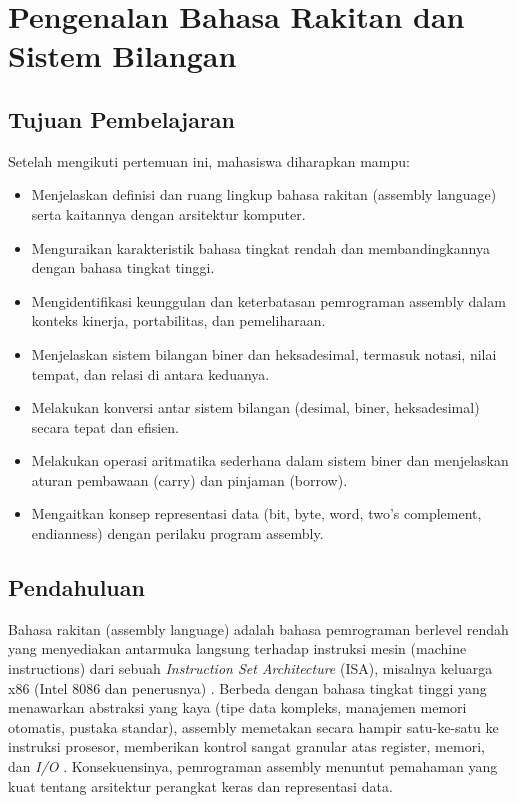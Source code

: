 \chapter{Pengenalan Bahasa Rakitan dan Sistem Bilangan}\label{ch:pengenalan}

\section{Tujuan Pembelajaran}\label{sec:pengenalan-tujuan}
Setelah mengikuti pertemuan ini, mahasiswa diharapkan mampu:
\begin{itemize}
    \item Menjelaskan definisi dan ruang lingkup bahasa rakitan (assembly language) serta kaitannya dengan arsitektur komputer.
    \item Menguraikan karakteristik bahasa tingkat rendah dan membandingkannya dengan bahasa tingkat tinggi.
    \item Mengidentifikasi keunggulan dan keterbatasan pemrograman assembly dalam konteks kinerja, portabilitas, dan pemeliharaan.
    \item Menjelaskan sistem bilangan biner dan heksadesimal, termasuk notasi, nilai tempat, dan relasi di antara keduanya.
    \item Melakukan konversi antar sistem bilangan (desimal, biner, heksadesimal) secara tepat dan efisien.
    \item Melakukan operasi aritmatika sederhana dalam sistem biner dan menjelaskan aturan pembawaan (carry) dan pinjaman (borrow).
    \item Mengaitkan konsep representasi data (bit, byte, word, two's complement, endianness) dengan perilaku program assembly.
\end{itemize}

\section{Pendahuluan}\label{sec:pengenalan-pendahuluan}
Bahasa rakitan (assembly language) adalah bahasa pemrograman berlevel rendah yang menyediakan antarmuka langsung terhadap instruksi mesin (machine instructions) dari sebuah \textit{Instruction Set Architecture} (ISA), misalnya keluarga x86 (Intel 8086 dan penerusnya) \cite{intel2019manual32}. Berbeda dengan bahasa tingkat tinggi yang menawarkan abstraksi yang kaya (tipe data kompleks, manajemen memori otomatis, pustaka standar), assembly memetakan secara hampir satu-ke-satu ke instruksi prosesor, memberikan kontrol sangat granular atas register, memori, dan \textit{I/O} \cite{hyde2010art}. Konsekuensinya, pemrograman assembly menuntut pemahaman yang kuat tentang arsitektur perangkat keras dan representasi data.

